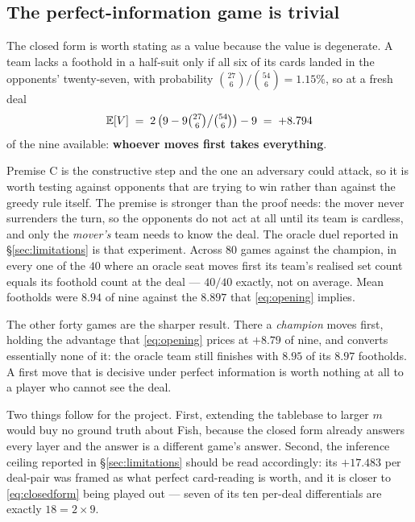 \documentclass[11pt,letterpaper]{article}
\begin{document}
\subsection{The perfect-information game is trivial}

The closed form is worth stating as a value because the value is degenerate. A
team lacks a foothold in a half-suit only if all six of its cards landed in the
opponents' twenty-seven, with probability $\binom{27}{6}/\binom{54}{6} =
1.15\%$, so at a fresh deal
\begin{equation}
\mathbb{E}[V] \;=\; 2\left(9 - 9\tbinom{27}{6}\big/\tbinom{54}{6}\right) - 9
\;=\; +8.794
\label{eq:opening}
\end{equation}
of the nine available: \textbf{whoever moves first takes everything}.

Premise C is the constructive step and the one an adversary could attack, so it
is worth testing against opponents that are trying to win rather than against
the greedy rule itself. The premise is stronger than the proof needs: the mover
never surrenders the turn, so the opponents do not act at all until its team is
cardless, and only the \emph{mover's} team needs to know the deal. The oracle
duel reported in \S\ref{sec:limitations} is that experiment. Across $80$ games against
the champion, in every one of the $40$ where an oracle seat moves first its
team's realised set count equals its foothold count at the deal --- $40/40$
exactly, not on average. Mean footholds were $8.94$ of nine against the $8.897$
that \eqref{eq:opening} implies.

The other forty games are the sharper result. There a \emph{champion} moves
first, holding the advantage that \eqref{eq:opening} prices at $+8.79$ of nine,
and converts essentially none of it: the oracle team still finishes with $8.95$
of its $8.97$ footholds. A first move that is decisive under perfect
information is worth nothing at all to a player who cannot see the deal.

Two things follow for the project. First, extending the tablebase to larger $m$
would buy no ground truth about Fish, because the closed form already answers
every layer and the answer is a different game's answer. Second, the inference
ceiling reported in \S\ref{sec:limitations} should be read accordingly: its
$+17.483$ per deal-pair was framed as what perfect card-reading is worth, and it
is closer
to \eqref{eq:closedform} being played out --- seven of its ten per-deal
differentials are exactly $18 = 2 \times 9$.
\end{document}
